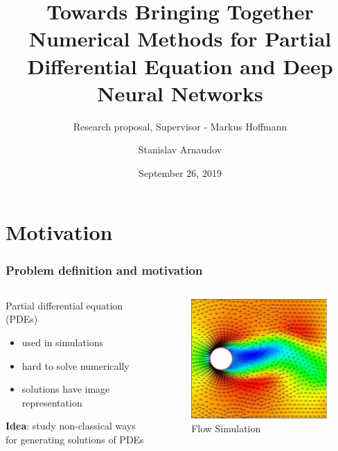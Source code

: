 \documentclass[18pt]{beamer}
\title[Research proposal]{Towards Bringing Together Numerical Methods for Partial Differential Equation and Deep Neural Networks}
\subtitle{Research proposal, Supervisor - Markus Hoffmann}
\author{Stanislav Arnaudov}
\institute{Chair for Computer Architecture and Parallel Processing}
\date{September 26, 2019}
\begin{document}
\begin{frame}
 \titlepage
\end{frame}


\section{Motivation}

\begin{frame}
  \frametitle{Problem definition and motivation}
  \begin{columns}
    \begin{column}{0.5\textwidth}
      Partial differential equation (PDEs)
      \begin{itemize}
      \item used in simulations
      \item hard to solve numerically
      \item solutions have image representation
      \end{itemize}
      \vspace{0.25cm}
      \textbf{Idea}: study non-classical ways for generating solutions of PDEs
      \vspace{-0.5cm}
    \end{column}
    \begin{column}{0.5\textwidth}
      \begin{center}
        \begin{figure}[htb]
          \includegraphics[scale=0.35]{images/pde}
          \caption{Flow Simulation\footnotemark}
        \end{figure}
      \end{center}
    \end{column}
  \end{columns}
\end{frame}
\end{document}
